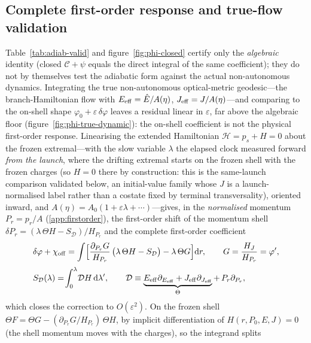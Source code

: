 \documentclass[12pt]{iopart}
\theoremstyle{plain}
\theoremstyle{definition}
\theoremstyle{remark}
\newcommand{\Ehat}{\hat E}
\newcommand{\dd}{\mathrm{d}}
\begin{document}
\subsection{Complete first-order response and true-flow validation}
Table~\ref{tab:adiab-valid}
and figure~\ref{fig:phi-closed} certify only the \emph{algebraic} identity (closed
$\mathcal{C}+\psi$ equals the direct integral of the same coefficient); they do not by
themselves test the adiabatic form against the actual non-autonomous dynamics. Integrating
the true non-autonomous optical-metric geodesic---the branch-Hamiltonian flow with
$E_{\rm eff}=\Ehat/A(\eta)$, $J_{\rm eff}=J/A(\eta)$---and comparing to
the on-shell shape $\varphi_0+\varepsilon\,\delta\varphi$ leaves a residual linear in
$\varepsilon$, far above the algebraic floor
(figure~\ref{fig:phi-true-dynamic}): the on-shell coefficient is not the physical
first-order response. Linearising the extended Hamiltonian
$\mathcal H=p_s+H=0$ about the frozen extremal---with the slow variable
$\lambda$ the elapsed clock measured forward \emph{from the launch}, where the drifting
extremal starts on the frozen shell with the frozen charges (so $H=0$ there by
construction: this is the same-launch comparison validated below, an initial-value
family whose $J$ is a launch-normalised label rather than a costate fixed by terminal
transversality), oriented inward, and
$A(\eta)=A_0(1+\varepsilon\lambda+\cdots)$---gives, in the \emph{normalised} momentum
$P_r=p_r/A$ (\ref{app:firstorder}), the first-order shift of the momentum shell
$\delta P_r=(\lambda\,\Theta H-S_{\mathcal D})/H_{P_r}$ and the complete first-order
coefficient
\begin{equation}
    \begin{aligned}
    &\delta\varphi+\chi_{\rm off}=\int\!\Big[\frac{\partial_{P_r}G}{H_{P_r}}\,
    \big(\lambda\,\Theta H-S_{\mathcal D}\big)-\lambda\,\Theta G\Big]\dd r,\qquad
    G=\frac{H_J}{H_{P_r}}=\varphi',\\[2pt]
    &S_{\mathcal D}(\lambda)=\!\int_0^{\lambda}\!\mathcal D H\,\dd\lambda',\qquad
    \mathcal D\equiv\underbrace{E_{\rm eff}\partial_{E_{\rm eff}}+J_{\rm eff}\partial_{J_{\rm eff}}}_{\Theta}
    +\,P_r\partial_{P_r},
    \end{aligned}
    \label{eq:adiab-exact}
\end{equation}
which closes the correction to $O(\varepsilon^2)$. On the frozen shell
$\Theta F=\Theta G-(\partial_{P_r}G/H_{P_r})\,\Theta H$, by implicit differentiation of
$H(r,P_0,E,J)=0$ (the shell momentum moves with the charges), so the integrand splits
\end{document}
